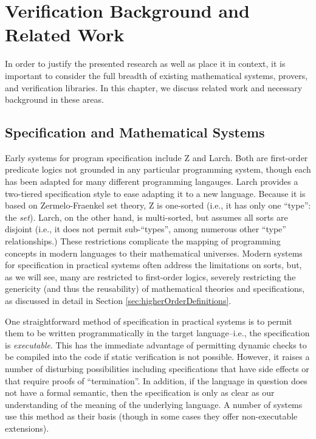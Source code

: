 \chapter{Verification Background and Related Work}\label{sec:background}

In order to justify the presented research as well as place it in context, it is important to consider the full breadth of existing mathematical systems, provers, and verification libraries.  In this chapter, we discuss related work and necessary background in these areas.

\section{Specification and Mathematical Systems}\label{sec:overviewSpec}
Early systems for program specification include Z\cite{dillerZ} and Larch\cite{guttagLarch}.  Both are first-order predicate logics not grounded in any particular programming system, though each has been adapted for many different programming langauges.  Larch provides a two-tiered specification style to ease adapting it to a new language.  Because it is based on Zermelo-Fraenkel set theory, Z is one-sorted (i.e., it has only one ``type'': the \emph{set}).  Larch, on the other hand, is multi-sorted, but assumes all sorts are disjoint (i.e., it does not permit sub-``types'', among numerous other ``type'' relationships.)  These restrictions complicate the mapping of programming concepts in modern languages to their mathematical universes.  Modern systems for specification in practical systems often address the limitations on sorts, but, as we will see, many are restricted to first-order logics, severely restricting the genericity (and thus the reusability) of mathematical theories and specifications, as discussed in detail in Section \ref{sec:higherOrderDefinitions}.

One straightforward method of specification in practical systems is to permit them to be written programmatically in the target language--i.e., the specification is \emph{executable}.  This has the immediate advantage of permitting dynamic checks to be compiled into the code if static verification is not possible.  However, it raises a number of disturbing possibilities including specifications that have side effects or that require proofs of ``termination''.  In addition, if the language in question does not have a formal semantic, then the specification is only as clear as our understanding of the meaning of the underlying language.  A number of systems use this method as their basis (though in some cases they offer non-executable extensions).

